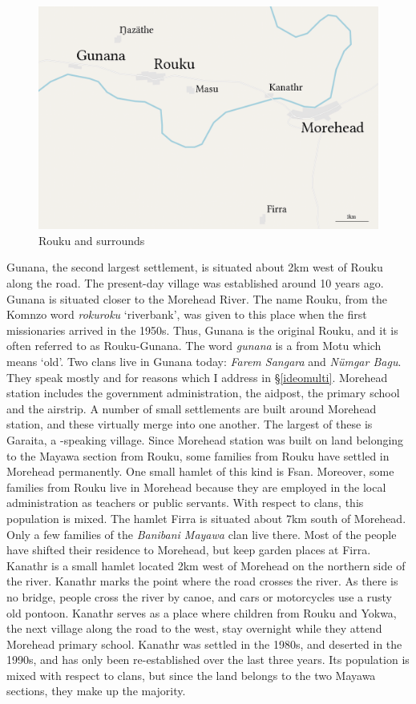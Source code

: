 \begin{figure}
    \includegraphics[width=.9\textwidth]{figures/map2.png}
  \caption[Rouku]{Rouku and surrounds}
  \label{fig-01-ROUKUmap}
\end{figure}%

Gunana, the second largest settlement, is situated about 2km west of Rouku along the road. The present-day village was established around 10 years ago. Gunana is situated closer to the Morehead River. The name Rouku, from the Komnzo word \emph{rokuroku} `riverbank', was given to this place when the first missionaries arrived in the 1950s. Thus, Gunana is the original Rouku, and it is often referred to as Rouku-Gunana. The word \emph{gunana} is a  from Motu which means `old'. Two clans live in Gunana today: \emph{Farem Sangara} and \emph{Nümgar Bagu}. They speak mostly  and  for reasons which I address in {\S}\ref{ideomulti}. Morehead station includes the government administration, the aidpost, the primary school and the airstrip. A number of small settlements are built around Morehead station, and these virtually merge into one another. The largest of these is Garaita, a -speaking village. Since Morehead station was built on land belonging to the Mayawa section from Rouku, some families from Rouku have settled in Morehead permanently. One small hamlet of this kind is Fsan. Moreover, some families from Rouku live in Morehead because they are employed in the local administration as teachers or public servants. With respect to clans, this population is mixed. The hamlet Firra is situated about 7km south of Morehead. Only a few families of the \emph{Banibani Mayawa} clan live there. Most of the people have shifted their residence to Morehead, but keep garden places at Firra. Kanathr is a small hamlet located 2km west of Morehead on the northern side of the river. Kanathr marks the point where the road crosses the river. As there is no bridge, people cross the river by canoe, and cars or motorcycles use a rusty old pontoon. Kanathr serves as a place where children from Rouku and Yokwa, the next village along the road to the west, stay overnight while they attend Morehead primary school. Kanathr was settled in the 1980s, and deserted in the 1990s, and has only been re-established over the last three years. Its population is mixed with respect to clans, but since the land belongs to the two Mayawa sections, they make up the majority.

